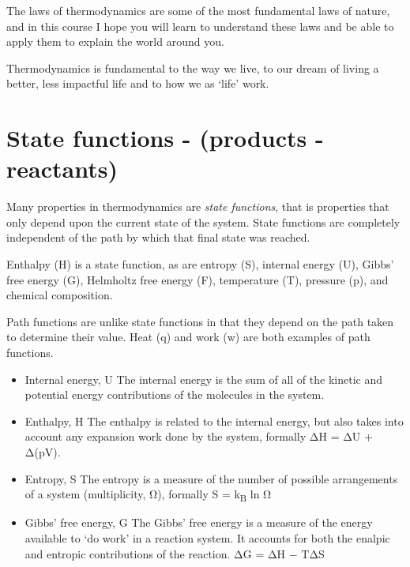 \documentclass[
]{book}
\begin{document}
The laws of thermodynamics are some of the most fundamental laws of nature, and in this course I hope you will learn to understand these laws and be able to apply them to explain the world around you.

Thermodynamics is fundamental to the way we live, to our dream of living a better, less impactful life and to how we as `life' work.

\hypertarget{sec:state}{%
\section{State functions - (products - reactants)}\label{sec:state}}

Many properties in thermodynamics are \emph{state functions}, that is properties that only depend upon the current state of the system. State functions are completely independent of the path by which that final state was reached.

Enthalpy (H) is a state function, as are entropy (S), internal energy (U), Gibbs' free energy (G), Helmholtz free energy (F), temperature (T), pressure (p), and chemical composition.

Path functions are unlike state functions in that they depend on the path taken to determine their value.
Heat (q) and work (w) are both examples of path functions.

\begin{itemize}
\item
  Internal energy, U The internal energy is the sum of all of the kinetic and potential energy contributions of the molecules in the system.
\item
  Enthalpy, H The enthalpy is related to the internal energy, but also takes into account any expansion work done by the system, formally ΔH = ΔU + Δ(pV).
\item
  Entropy, S The entropy is a measure of the number of possible arrangements of a system (multiplicity, Ω), formally S = k\textsubscript{B} ln Ω
\item
  Gibbs' free energy, G The Gibbs' free energy is a measure of the energy available to `do work' in a reaction system. It accounts for both the enalpic and entropic contributions of the reaction. ΔG = ΔH − TΔS
\end{itemize}
\end{document}

